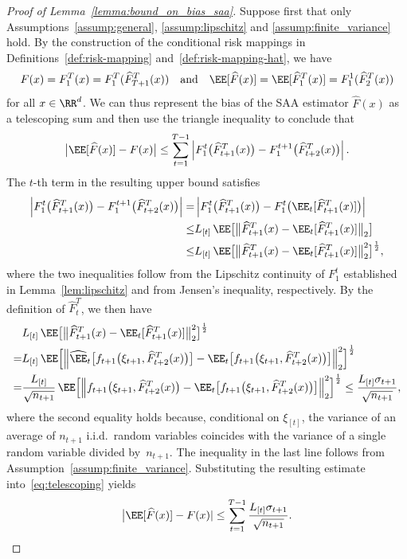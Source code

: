 \documentclass[11pt]{article}
\let\hat\widehat
\begin{document}
\begin{proof}[Proof of Lemma~\ref{lemma:bound_on_bias_saa}] 
Suppose first that only Assumptions~\ref{assump:general}, \ref{assump:lipschitz} and \ref{assump:finite_variance} hold. By the construction of the conditional risk mappings in Definitions~\ref{def:risk-mapping} and~\ref{def:risk-mapping-hat}, we have 
\[
    F(x) = F_1^T(x) = F_1^{T}(\hat F_{T+1}^T(x)) \quad \text{and} \quad \EE[\hat F(x)] = \EE[\hat F_1^T(x)]= F_1^1(\hat F_2^T(x))
\]
for all $x\in\RR^d$. We can thus represent the bias of the SAA estimator $\hat F(x)$ as a telescoping sum and then use the triangle inequality to conclude that
\begin{align}
    \label{eq:telescoping}
    \big|\EE [\hat F(x)] - F(x) \big| \leq \sum_{t=1}^{T-1} \left| F_1^t \big( \hat F_{t+1}^T(x) \big) - F_1^{t+1} \big( \hat F_{t+2}^T(x) \big) \right|. 
\end{align}
The $t$-th term in the resulting upper bound satisfies
\begin{align*}
    \left|F_1^t \big( \hat F_{t+1}^T(x) \big) - F_1^{t+1} \big( \hat F_{t+2}^T(x) \big) \right|= & \left| F_1^t \big( \hat F_{t+1}^T(x) \big) - F_1^{t} \big( \EE_t [\hat F_{t+1}^T(x) ]\big) \right| \\
    \leq & L_{[t]} \, \EE \big[ \big\| \hat F_{t+1}^T(x) - \EE_t[\hat F_{t+1}^T(x)] \big\|_2 \big]\\
    \leq & L_{[t]} \, \EE \big[ \big\| \hat F_{t+1}^T(x) - \EE_t[\hat F_{t+1}^T(x)] \big\|_2^2 \big]^{\frac{1}{2}} ,
\end{align*} 
where the two inequalities follow from the Lipschitz continuity of $F_1^t$ established in Lemma~\ref{lem:lipschitz} and from Jensen's inequality, respectively. By the definition of $\hat F_t^T$, we then have
\begin{align*}
& L_{[t]} \, \EE \big[ \big\| \hat F_{t+1}^T(x) - \EE_t[\hat F_{t+1}^T(x)] \big\|_2^2 \big]^{\frac{1}{2}}\\
    = & L_{[t]} \, \EE \Big[ \Big\| \hat \EE_t\big[ f_{t+1}\big( \xi_{t+1}, \hat F_{t+2}^T(x)\big) \big] - \EE_t\big[ f_{t+1}\big( \xi_{t+1}, \hat F_{t+2}^T(x)\big) \big] \Big\|_2^2 \Big]^{\frac{1}{2}} \\
    = & \frac{L_{[t]}}{\sqrt{n_{t+1}}} \, \EE \Big[ \Big\| f_{t+1}\big( \xi_{t+1}, \hat F_{t+2}^T(x)\big) - \EE_t\big[ f_{t+1}\big( \xi_{t+1}, \hat F_{t+2}^T(x)\big) \big] \Big\|_2^2 \Big]^{\frac{1}{2}} 
    \leq \frac{L_{[t]}\sigma_{t+1}}{\sqrt{n_{t+1}}},
\end{align*}   
where the second equality holds because, conditional on $\xi_{[t]}$, 
the variance of an average of $n_{t+1}$ i.i.d.\ random variables coincides with the variance of a single random variable divided by~$n_{t+1}$. The inequality in the last line follows from Assumption~\ref{assump:finite_variance}. Substituting the resulting estimate into~\eqref{eq:telescoping} yields
\begin{align*}
    \big|\EE [\hat F(x)] - F(x) | \leq \sum_{t=1}^{T-1} \frac{L_{[t]}\sigma_{t+1}}{\sqrt{n_{t+1}}}. 
\end{align*}


\end{proof}
\end{document}
